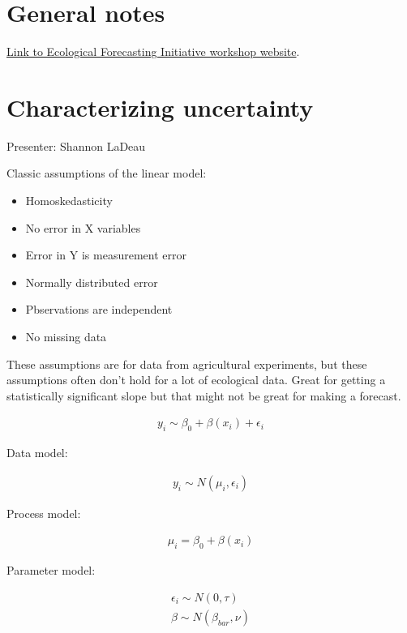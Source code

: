 \documentclass[12pt, oneside]{article}   	%
\begin{document}
 

\tableofcontents

\clearpage

\section*{General notes}

\href{https://ecoforecast.org/nefi2020/}{Link to Ecological Forecasting Initiative workshop website}.

\section{Characterizing uncertainty}

\noindent Presenter: Shannon LaDeau

Classic assumptions of the linear model:

\begin{itemize}
\item Homoskedasticity
\item No error in X variables
\item Error in Y is measurement error
\item Normally distributed error
\item Pbservations are independent
\item No missing data
\end{itemize}

These assumptions are for data from agricultural experiments, but these assumptions often don't hold for a lot of ecological data. Great for getting a statistically significant slope but that might not be great for making a forecast.

\begin{align}
 y_i \sim \beta_0 + \beta(x_i) + \epsilon_i 
\end{align}

Data model:

\begin{align}
 y_i \sim N(\mu_i, \epsilon_i)
 \end{align}
 
 Process model:
 
 \begin{align}
 \mu_i = \beta_0 + \beta(x_i)
 \end{align}

 Parameter model:
 
 \begin{align}
 \epsilon_i \sim N(0,\tau) \\
 \beta \sim N(\beta_{bar}, \nu)
 \end{align}
 
\end{document}
